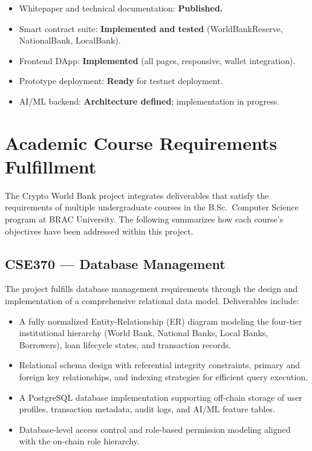 \documentclass[11pt,a4paper]{article}
\begin{document}
\begin{itemize}[noitemsep]
\item Whitepaper and technical documentation: \textbf{Published.}
\item Smart contract suite: \textbf{Implemented and tested} (WorldBankReserve, NationalBank, LocalBank).
\item Frontend DApp: \textbf{Implemented} (all pages, responsive, wallet integration).
\item Prototype deployment: \textbf{Ready} for testnet deployment.
\item AI/ML backend: \textbf{Architecture defined}; implementation in progress.
\end{itemize}

\section{Academic Course Requirements Fulfillment}

The Crypto World Bank project integrates deliverables that satisfy the requirements of multiple undergraduate courses in the B.Sc.\ Computer Science program at BRAC University. The following summarizes how each course's objectives have been addressed within this project.

\subsection{CSE370 --- Database Management}

The project fulfills database management requirements through the design and implementation of a comprehensive relational data model. Deliverables include:
\begin{itemize}[noitemsep]
\item A fully normalized Entity-Relationship (ER) diagram modeling the four-tier institutional hierarchy (World Bank, National Banks, Local Banks, Borrowers), loan lifecycle states, and transaction records.
\item Relational schema design with referential integrity constraints, primary and foreign key relationships, and indexing strategies for efficient query execution.
\item A PostgreSQL database implementation supporting off-chain storage of user profiles, transaction metadata, audit logs, and AI/ML feature tables.
\item Database-level access control and role-based permission modeling aligned with the on-chain role hierarchy.
\end{itemize}
\end{document}
